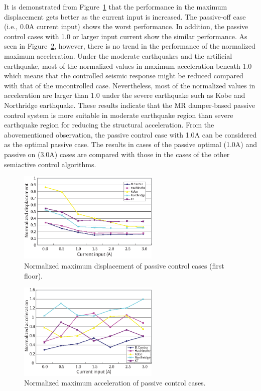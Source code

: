 It is demonstrated from Figure~\ref{fig:n3-12} that the performance in the maximum displacement gets better as the current input is increased. The passive-off case (i.e., 0.0A current input) shows the worst performance. In addition, the passive control cases with 1.0 or larger input current show the similar performance. As seen in Figure~\ref{fig:n3-13}, however, there is no trend in the performance of the normalized maximum acceleration. Under the moderate earthquakes and the artificial earthquake, most of the normalized values in maximum acceleration beneath 1.0 which means that the controlled seismic response might be reduced compared with that of the uncontrolled case. Nevertheless, most of the normalized values in acceleration are larger than 1.0 under the severe earthquake such as Kobe and Northridge earthquake. These results indicate that the MR damper-based passive control system is more suitable in moderate earthquake region than severe earthquake region for reducing the structural acceleration. From the abovementioned  observation, the passive control case with 1.0A can be considered as the optimal passive case. The results in cases of the passive optimal (1.0A) and passive on (3.0A) cases are compared with those in the cases of the other semiactive control algorithms.

\begin{figure}[!ht]
\centering
\includegraphics[width=0.6\textwidth] {figure/n3-12.eps}
\caption{Normalized maximum displacement of passive control
cases (first floor).}
\label{fig:n3-12}
\end{figure}

\begin{figure}[!ht]
\centering
\includegraphics[width=0.6\textwidth] {figure/n3-13.eps}
\caption{Normalized maximum acceleration of passive control
cases.}
\label{fig:n3-13}
\end{figure}

